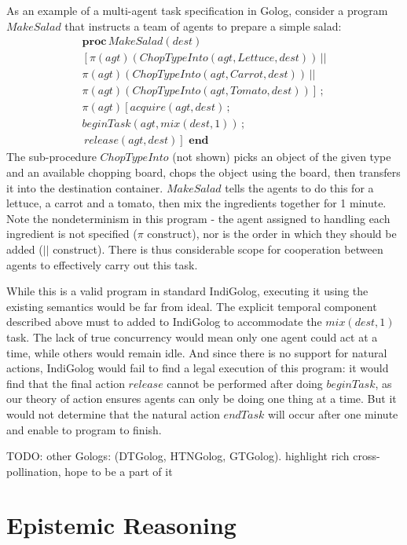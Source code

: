 As an example of a multi-agent task specification in Golog, consider
a program $MakeSalad$ that instructs a team of agents to prepare
a simple salad:\begin{multline}
\mathbf{proc}\, MakeSalad(dest)\\
\left[\pi(agt)(ChopTypeInto(agt,Lettuce,dest))\,||\right.\\
\pi(agt)(ChopTypeInto(agt,Carrot,dest))\,||\\
\left.\pi(agt)(ChopTypeInto(agt,Tomato,dest))\right]\,;\\
\pi(agt)\left[acquire(agt,dest)\,;\,\right.\\
beginTask(agt,mix(dest,1))\,;\\
\left.\, release(agt,dest)\right]\,\,\mathbf{end}\label{eqn:Background:MakeSalad}\end{multline}
 The sub-procedure $ChopTypeInto$ (not shown) picks an object of
the given type and an available chopping board, chops the object using
the board, then transfers it into the destination container. $MakeSalad$
tells the agents to do this for a lettuce, a carrot and a tomato,
then mix the ingredients together for 1 minute. Note the nondeterminism
in this program - the agent assigned to handling each ingredient is
not specified ($\pi$ construct), nor is the order in which they should
be added ($||$ construct). There is thus considerable scope for cooperation
between agents to effectively carry out this task.

While this is a valid program in standard IndiGolog, executing it
using the existing semantics would be far from ideal. The explicit
temporal component described above must to added to IndiGolog to accommodate
the $mix(dest,1)$ task. The lack of true concurrency would mean only
one agent could act at a time, while others would remain idle. And
since there is no support for natural actions, IndiGolog would fail
to find a legal execution of this program: it would find that the
final action $release$ cannot be performed after doing $beginTask$,
as our theory of action ensures agents can only be doing one thing
at a time. But it would not determine that the natural action $endTask$
will occur after one minute and enable to program to finish.

TODO: other Gologs: (DTGolog, HTNGolog, GTGolog). highlight rich cross-pollination,
hope to be a part of it


\section{Epistemic Reasoning\label{sec:Background:Epistemic-Reasoning}}

